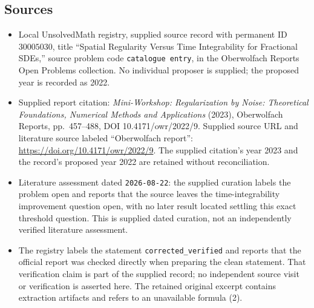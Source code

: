 \documentclass[11pt]{article}
\begin{document}
\subsection{Sources}
\begin{itemize}
\item Local UnsolvedMath registry, supplied source record with permanent ID \(30005030\), title ``Spatial Regularity Versus Time Integrability for Fractional SDEs,'' source problem code \texttt{catalogue entry}, in the Oberwolfach Reports Open Problems collection. No individual proposer is supplied; the proposed year is recorded as 2022.
\item Supplied report citation: \emph{Mini-Workshop: Regularization by Noise: Theoretical Foundations, Numerical Methods and Applications} (2023), Oberwolfach Reports, pp.~457--488, DOI 10.4171/owr/2022/9. Supplied source URL and literature source labeled ``Oberwolfach report'': \url{https://doi.org/10.4171/owr/2022/9}. The supplied citation's year 2023 and the record's proposed year 2022 are retained without reconciliation.
\item Literature assessment dated \texttt{2026-08-22}: the supplied curation labels the problem open and reports that the source leaves the time-integrability improvement question open, with no later result located settling this exact threshold question. This is supplied dated curation, not an independently verified literature assessment.
\item The registry labels the statement \texttt{corrected\_verified} and reports that the official report was checked directly when preparing the clean statement. That verification claim is part of the supplied record; no independent source visit or verification is asserted here. The retained original excerpt contains extraction artifacts and refers to an unavailable formula (2).
\end{itemize}
\end{document}

